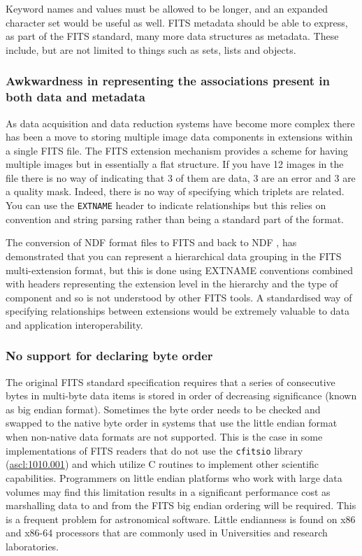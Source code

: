 \documentclass[final,authoryear,5p,times,twocolumn]{elsarticle}
\begin{document}
Keyword names and values must be allowed to be longer, and an expanded
character set would be useful as well. FITS metadata should be able to
express, as part of the FITS standard, many more data structures as
metadata. These include, but are not limited to things such as sets,
lists and objects.


\subsubsection{Awkwardness in representing the associations present in both data and metadata}


As data acquisition and data reduction systems have become more
complex there has been a move to storing multiple image data
components in extensions within a single FITS file. The FITS
extension mechanism provides a scheme for having multiple images but
in essentially a flat structure. If you have 12 images in the file
there is no way of indicating that 3 of them are data, 3 are an error
and 3 are a quality mask. Indeed, there is no way of specifying which
triplets are related. You can use the \texttt{EXTNAME} header to indicate
relationships but this relies on convention and string parsing rather
than being a standard part of the format.


The conversion of NDF format files to FITS and back to NDF
\citep{SUN55,1997STARB..19...14C}, has demonstrated that you can
represent a hierarchical data grouping in the FITS multi-extension
format, but this is done using EXTNAME conventions combined with
headers representing the extension level in the hierarchy and the type
of component and so is not understood by other FITS tools. A
standardised way of specifying relationships between extensions would
be extremely valuable to data and application interoperability.


\subsubsection{No support for declaring byte order}


The original FITS standard specification \citep{1981A&AS...44..363W}
requires that a series of consecutive bytes in multi-byte data items is
stored in order of decreasing significance (known as big endian format).
Sometimes the byte order needs to be checked and swapped to the native byte
order in systems that use the little endian format when non-native data
formats are not supported.  This is the case in some implementations of FITS
readers that do not use the \texttt{cfitsio} library
(\href{http://ascl.net/1010.001}{ascl:1010.001}) and which utilize C
routines to implement other scientific capabilities.  Programmers on little
endian platforms who work with large data volumes may find this limitation
results in a significant performance cost as marshalling data to and from
the FITS big endian ordering will be required.  This is a frequent problem
for astronomical software. Little endianness is found on x86 and x86-64
processors that are commonly used in Universities and research laboratories.
\end{document}
